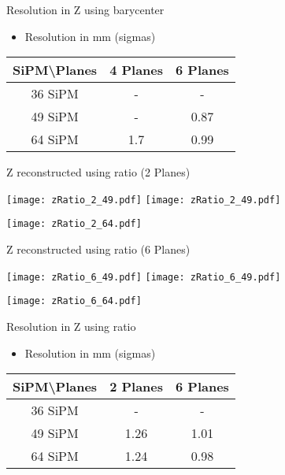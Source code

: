 \documentclass{beamer}
\begin{document}
\begin{frame}{Resolution in Z using barycenter}
\begin{center}
\begin{itemize}
\item Resolution in mm (sigmas)
\vspace{0.5 cm}
\end{itemize}
 \begin{tabular}{c|cc|}
  \toprule
  SiPM\textbackslash Planes & \textbf{4 Planes} & \textbf{6 Planes} \\
   \hline
  36 SiPM & - & -  \\
  49 SiPM & - & 0.87 \\
  64 SiPM & 1.7 & 0.99 \\
    \toprule
 \end{tabular}
\end{center}
\end{frame}

\begin{frame}{Z reconstructed using ratio (2 Planes)}
\begin{adjustwidth}{-1.5em}{-1.5em}
	\texttt{[image: zRatio\_2\_49.pdf]}
	\texttt{[image: zRatio\_2\_49.pdf]} \\
	\begin{center} {\texttt{[image: zRatio\_2\_64.pdf]}} \end{center}
\end{adjustwidth}
\end{frame}


\begin{frame}{Z reconstructed using ratio (6 Planes)}
\begin{adjustwidth}{-1.5em}{-1.5em}
	\texttt{[image: zRatio\_6\_49.pdf]}
	\texttt{[image: zRatio\_6\_49.pdf]} \\
	\begin{center} {\texttt{[image: zRatio\_6\_64.pdf]}} \end{center}
\end{adjustwidth}
\end{frame}

\begin{frame}{Resolution in Z using ratio}
\begin{center}
\begin{itemize}
\item Resolution in mm (sigmas)
\vspace{0.5 cm}
\end{itemize}
 \begin{tabular}{c|cc|}
  \toprule
  SiPM\textbackslash Planes & \textbf{2 Planes} & \textbf{6 Planes} \\
   \hline
  36 SiPM & - & -  \\
  49 SiPM & 1.26 & 1.01 \\
  64 SiPM & 1.24 & 0.98 \\
    \toprule
 \end{tabular}
\end{center}
\end{frame}
\end{document}
